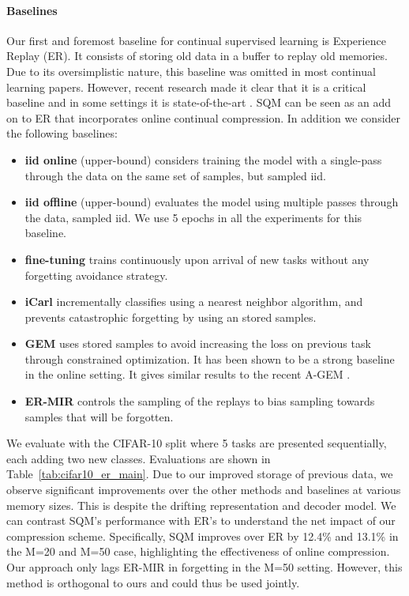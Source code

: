 \documentclass[colorinlistoftodos]{article} %
\begin{document}
\paragraph{Baselines}
Our first and foremost baseline for continual supervised learning is Experience Replay (ER). It consists of storing old data in a buffer to replay old memories. Due to its oversimplistic nature, this baseline was omitted in most continual learning papers. However, recent research made it clear that it is a  critical baseline and in some settings it is state-of-the-art \citep{chaudhry2019continual,aljundi2019online,rolnick2018experience}. SQM can be seen as an add on to ER that incorporates online continual compression. In addition we consider the following baselines:
\begin{itemize}
    \item \textbf{iid online} (upper-bound)
    considers training the model with a single-pass through the data on the same set of samples, but sampled iid.
    \item \textbf{iid offline} (upper-bound)
    evaluates the model using multiple passes through the data, sampled iid. We use 5 epochs in all the experiments for this baseline.
    \item \textbf{fine-tuning} trains continuously upon arrival of new tasks without any forgetting avoidance strategy.
    \item \textbf{iCarl} \citep{rebuffi2017icarl} incrementally classifies using a nearest neighbor algorithm, and prevents catastrophic forgetting by using an stored samples.
    \item \textbf{GEM} \citep{lopez2017gradient} uses stored samples to avoid increasing the loss on previous task through constrained optimization. It has been shown to be a strong baseline in the online setting. It gives similar results to the recent A-GEM \cite{chaudhry2018efficient}.
    \item  \textbf{ER-MIR} \citep{aljundi2019online} controls the sampling of the replays to bias sampling towards samples that will be forgotten.
\end{itemize}

We evaluate with the CIFAR-10 split \citep{aljundi2018Online} where 5 tasks are presented sequentially, each adding two new classes. Evaluations are shown in Table~\ref{tab:cifar10_er_main}. 
Due to our improved storage of previous data, we observe significant improvements over the other methods and baselines at various memory sizes. This is despite the drifting representation and decoder model. We can contrast SQM's performance with ER's to understand the net impact of our compression scheme. Specifically, SQM improves over ER by 12.4\% and 13.1\% in the M=20 and M=50 case, highlighting the effectiveness of online compression. Our approach only lags ER-MIR in forgetting in the M=50 setting. However, this method is orthogonal to ours and could thus be used jointly.
\end{document}
